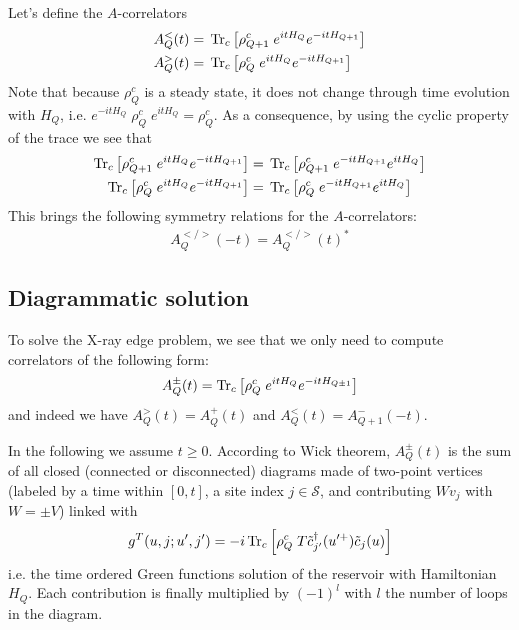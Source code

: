 \documentclass[12pt]{article}
\begin{document}
Let's define the $A$-correlators
\begin{subequations}
	\begin{align}
		A^<_Q(t) ={}& \Tr_c \qty[\rho^c_{Q+1} \; e^{it H_Q} e^{-it H_{Q+1}}]
		\\
		A^>_Q(t) ={}& \Tr_c \qty[\rho^c_Q \; e^{it H_Q} e^{-it H_{Q+1}}]
	\end{align}
\end{subequations}
Note that because $\rho_Q^c$ is a steady state, it does not change through time evolution with $H_Q$, i.e. $e^{-itH_Q} \;\rho_Q^c\; e^{itH_Q} = \rho_Q^c$.
As a consequence, by using the cyclic property of the trace we see that
\begin{subequations}
	\begin{align}
		\Tr_c \qty[\rho^c_{Q+1} \; e^{it H_Q} e^{-it H_{Q+1}}] ={}& \Tr_c \qty[\rho^c_{Q+1} \; e^{-it H_{Q+1}} e^{it H_Q}]
		\\
		\Tr_c \qty[\rho^c_Q \; e^{it H_Q} e^{-it H_{Q+1}}] ={}& \Tr_c \qty[\rho^c_Q \; e^{-it H_{Q+1}} e^{it H_Q}]
	\end{align}
\end{subequations}
This brings the following symmetry relations for the $A$-correlators:
\begin{align}
	A^{</>}_Q(-t) = A^{</>}_Q(t)^*
\end{align}
	
	
\subsection{Diagrammatic solution}

To solve the X-ray edge problem, we see that we only need to compute correlators of the following form:
\begin{equation}
	A_Q^{\pm}(t) = \Tr_c\qty[\rho_Q^c\; e^{itH_Q} e^{-it H_{Q\pm1}}]
\end{equation}
and indeed we have $A_Q^>(t) = A_Q^+(t)$ and $A_Q^<(t) = A_{Q+1}^-(-t)$.

In the following we assume $t \ge 0$.
According to Wick theorem, $A^{\pm}_Q(t)$ is the sum of all closed (connected or disconnected) diagrams made of two-point vertices (labeled by a time within $[0, t]$, a site index $j \in \mathcal{S}$, and contributing $W v_j$ with $W=\pm V$) linked with
\begin{equation}
	g^T(u, j; u', j') = -i \Tr_c\qty[\rho_Q^c \; T \tilde c_{j'}^\dag(u'^+) \tilde c_j(u)]
\end{equation}
i.e. the time ordered Green functions solution of the reservoir with Hamiltonian $H_Q$. Each contribution is finally multiplied by $(-1)^{l}$ with $l$ the number of loops in the diagram.
\end{document}
